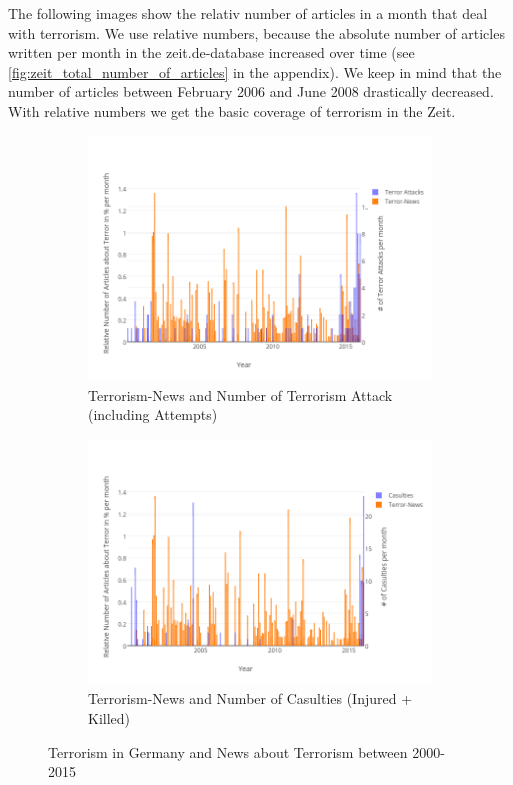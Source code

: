 The following images show the relativ number of articles in a month that deal with terrorism.
We use relative numbers,
because the absolute number of articles written per month in the zeit.de-database increased over time
(see \autoref{fig:zeit_total_number_of_articles} in the appendix).
We keep in mind that the number of articles between February 2006 and June 2008 drastically decreased.
With relative numbers we get the basic coverage of terrorism in the Zeit.
\begin{figure}[h]
  \centering
  \begin{subfigure}{1\textwidth}
    \centering
    \includegraphics[width=.8\textwidth]{images/zeit/german_attacks}
    \caption{Terrorism-News and Number of Terrorism Attack (including Attempts)}
    \label{fig:zeit_terrorism_germany_attacks}
  \end{subfigure}
  \begin{subfigure}{1\textwidth}
    \centering
    \includegraphics[width=.8\textwidth]{images/zeit/german_casulties}
    \caption{Terrorism-News and Number of Casulties (Injured + Killed)}
    \label{fig:zeit_terrorism_germany_casulties}
  \end{subfigure}
  \caption{Terrorism in Germany and News about Terrorism between 2000-2015}
  \label{fig:zeit_terrorism_germany}
\end{figure}
